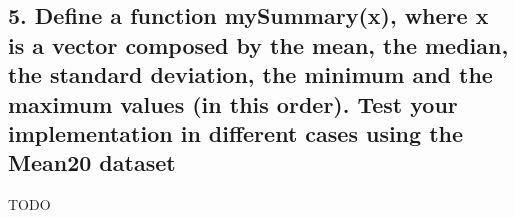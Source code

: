 \documentclass[
]{article}
\begin{document}
\newpage

\hypertarget{define-a-function-mysummaryx-where-x-is-a-vector-composed-by-the-mean-the-median-the-standard-deviation-the-minimum-and-the-maximum-values-in-this-order.-test-your-implementation-in-different-cases-using-the-mean20-dataset}{%
\subsection{5. Define a function mySummary(x), where x is a vector
composed by the mean, the median, the standard deviation, the minimum
and the maximum values (in this order). Test your implementation in
different cases using the Mean20
dataset}\label{define-a-function-mysummaryx-where-x-is-a-vector-composed-by-the-mean-the-median-the-standard-deviation-the-minimum-and-the-maximum-values-in-this-order.-test-your-implementation-in-different-cases-using-the-mean20-dataset}}

TODO
\end{document}
